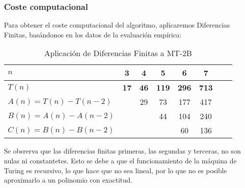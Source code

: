 \subsubsection*{Coste computacional}
Para obtener el coste computacional del algoritmo, aplicaremos Diferencias Finitas, basándonos en los datos de la evaluación empírica:


\begin{table}[h]
    \centering
    \begin{tabular}{|l|c|c|c|c|c|c|c|}
        \hline
        $n$ & \textbf{3} & \textbf{4} & \textbf{5} & \textbf{6} & \textbf{7}\\ \hline
        $T(n)$ & \textbf{17} & \textbf{46} & \textbf{119} & \textbf{296} & \textbf{713}      \\ \hline
        \hline
        $A(n) = T(n) - T(n-2)$ &    & 29 & 73 & 177 & 417 \\ \hline
        $B(n) = A(n) - A(n-2)$ &    &   & 44 & 104 & 240 \\ \hline
        $C(n) = B(n) - B(n-2)$ &    &   &    & 60 & 136 \\ \hline
    \end{tabular}
    \caption{Aplicación de Diferencias Finitas a MT-2B}
\end{table}

Se obsrerva que las diferencias finitas primeras, las segundas y terceras, no son nulas ni constantetes. Esto se debe a que el funcionamiento de la máquina de Turing es recursivo, lo que hace que no sea lineal, por lo que no es posible aproximarlo a un polinomio con exactitud.\\
